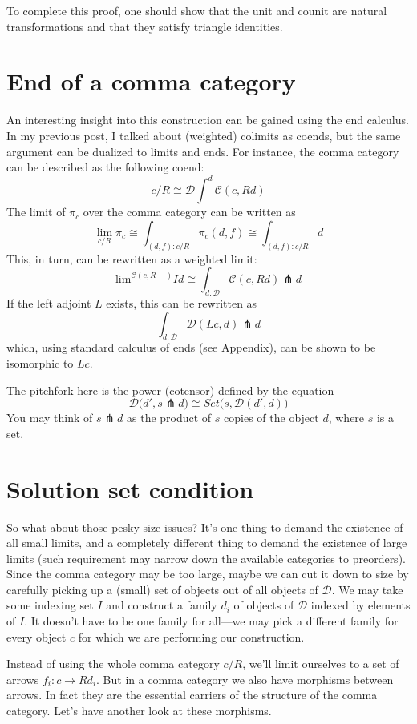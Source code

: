 \documentclass[11pt]{amsart}
\begin{document}
To complete this proof, one should show that the unit and counit are natural transformations and that they satisfy triangle identities. 

\section{End of a comma category}

An interesting insight into this construction can be gained using the end calculus. In my previous post, I talked about (weighted) colimits as coends, but the same argument can be dualized to limits and ends. For instance, the comma category can be described as the following coend:
\[c/R \cong \mathcal{D} \int^d \mathcal{C} (c, R d)\]
The limit of $\pi_c$ over the comma category can be written as
\[\lim_{c/R} \pi_c \cong \int_{(d, f)\colon c/R} \pi_c (d, f) \cong \int_{(d, f)\colon c/R} d\]
This, in turn, can be rewritten as a weighted limit:
\[\mbox{lim}^{\mathcal{C}(c, R -)} Id \cong \int_{d \colon \mathcal{D}} \mathcal{C}(c, R d) \pitchfork d\]
If the left adjoint $L$ exists, this can be rewritten as
\[\int_{d \colon \mathcal{D}} \mathcal{D}(L c, d) \pitchfork d\]
which, using standard calculus of ends (see Appendix), can be shown to be isomorphic to $L c$.

The pitchfork here is the power (cotensor) defined by the equation
\[\mathcal{D}\big(d', s \pitchfork d\big) \cong Set\big(s, \mathcal{D}(d', d)\big)\]
You may think of $s \pitchfork d$ as the product of $s$ copies of the object $d$, where $s$ is a set.

\section{Solution set condition}

So what about those pesky size issues? It's one thing to demand the existence of all small limits, and a completely different thing to demand the existence of large limits (such requirement may narrow down the available categories to preorders). Since the comma category may be too large, maybe we can cut it down to size by carefully picking up a (small) set of objects out of all objects of $\mathcal D$. We may take some indexing set $I$ and construct a family $d_i$ of objects of $\mathcal D$ indexed by elements of $I$. It doesn't have to be one family for all---we may pick a different family for every object $c$ for which we are performing our construction. 

Instead of using the whole comma category $c/R$, we'll limit ourselves to a set of arrows $f_i \colon c \to R d_i$. But in a comma category we also have morphisms between arrows. In fact they are the essential carriers of the structure of the comma category. Let's have another look at these morphisms.
\end{document}
